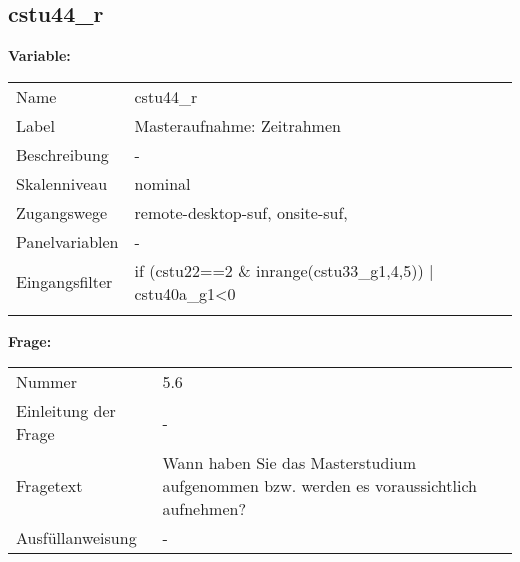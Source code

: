 	
	
	\subsection{cstu44\_r}
	\label{subSection:cstu44_r}

	\noindent\textbf{Variable:}\\
		\begin{tabular}{lL{11.3cm}}
			\label{tableVariable:cstu44_r}
			Name & cstu44\_r \\
			Label & Masteraufnahme: Zeitrahmen  \\
			Beschreibung & - \\
			Skalenniveau & nominal \\
			Zugangswege &
				remote-desktop-suf,
				onsite-suf,
 \\
			Panelvariablen & -
			 \\
			Eingangsfilter & if (cstu22==2 \& inrange(cstu33\_g1,4,5)) | cstu40a\_g1\textless{}0 \\
 \\
		\end{tabular}

		\vspace*{1 cm}
		\noindent\textbf{Frage:}\\
		\begin{tabular}{lL{11.3cm}}
			\label{tableQuestion:cstu44_r}
			Nummer & 5.6 \\
			Einleitung der Frage & - \\
			Fragetext & Wann haben Sie das Masterstudium aufgenommen bzw. werden es voraussichtlich aufnehmen? \\
			Ausfüllanweisung & - \\
		\end{tabular}





